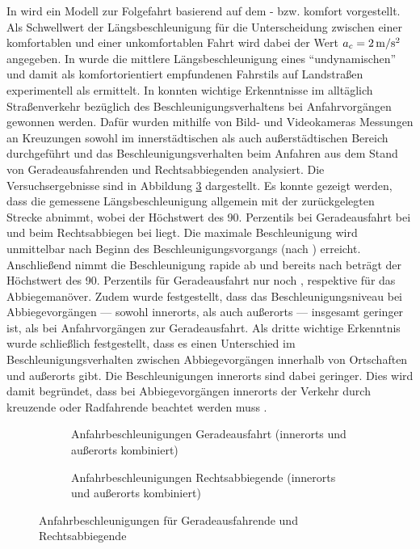 In \cite{Liu.2005} wird ein Modell zur Folgefahrt basierend auf dem - bzw. komfort vorgestellt. Als Schwellwert der Längsbeschleunigung für die Unterscheidung zwischen einer komfortablen und einer unkomfortablen Fahrt wird dabei der Wert $a_c = 2\,\mathrm{m/s^2}$ angegeben. In \cite{Radke.2013} wurde die mittlere Längsbeschleunigung eines ``undynamischen'' und damit als komfortorientiert empfundenen Fahrstils auf Landstraßen experimentell als  ermittelt. In \cite{Krause.2002} konnten wichtige Erkenntnisse im alltäglich Straßenverkehr bezüglich des Beschleunigungsverhaltens bei Anfahrvorgängen gewonnen werden. Dafür wurden mithilfe von Bild- und Videokameras Messungen an Kreuzungen sowohl im innerstädtischen als auch außerstädtischen Bereich durchgeführt und das Beschleunigungsverhalten beim Anfahren aus dem Stand von Geradeausfahrenden und Rechtsabbiegenden analysiert. Die Versuchsergebnisse sind in Abbildung \ref{fig:ax_s_krause} dargestellt. Es konnte gezeigt werden, dass die gemessene Längsbeschleunigung allgemein mit der zurückgelegten Strecke abnimmt, wobei der Höchstwert des 90. Perzentils bei Geradeausfahrt bei  und beim Rechtsabbiegen bei  liegt. Die maximale Beschleunigung wird unmittelbar nach Beginn des Beschleunigungsvorgangs (nach ) erreicht. Anschließend nimmt die Beschleunigung rapide ab und bereits nach  beträgt der Höchstwert des 90. Perzentils für Geradeausfahrt nur noch , respektive  für das Abbiegemanöver. Zudem wurde festgestellt, dass das Beschleunigungsniveau bei Abbiegevorgängen --- sowohl innerorts, als auch außerorts --- insgesamt geringer ist, als bei Anfahrvorgängen zur Geradeausfahrt. Als dritte wichtige Erkenntnis wurde schließlich festgestellt, dass es einen Unterschied im Beschleunigungsverhalten zwischen Abbiegevorgängen innerhalb von Ortschaften und außerorts gibt. Die Beschleunigungen innerorts sind dabei geringer. Dies wird damit begründet, dass bei Abbiegevorgängen innerorts der Verkehr durch kreuzende  oder Radfahrende beachtet werden muss \cite{Krause.2002}. 
\begin{figure}[h]
	\centering
	\begin{subfigure}[b]{0.49\linewidth}
		\centering
		\fontsize{32pt}{16pt}\selectfont
		\caption{Anfahrbeschleunigungen Geradeausfahrt (innerorts und außerorts kombiniert)}
		\label{fig:ax_s_geradeaus_krause}
	\end{subfigure}
	\hfill
	\begin{subfigure}[b]{0.49\textwidth}
		\centering
		\fontsize{32pt}{16pt}\selectfont
		\caption{Anfahrbeschleunigungen Rechtsabbiegende (innerorts und außerorts kombiniert)}
		\label{fig:ax_s_abbiegen_krause}
	\end{subfigure}
	\caption{Anfahrbeschleunigungen für Geradeausfahrende und Rechtsabbiegende \cite{Krause.2002}}
	\label{fig:ax_s_krause}
\end{figure}
